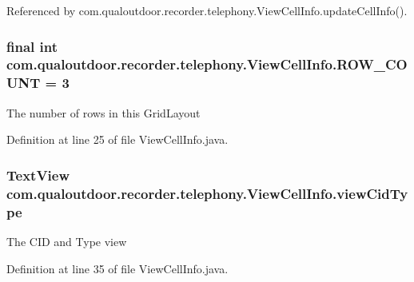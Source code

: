 Referenced by com.\-qualoutdoor.\-recorder.\-telephony.\-View\-Cell\-Info.\-update\-Cell\-Info().

\hypertarget{classcom_1_1qualoutdoor_1_1recorder_1_1telephony_1_1ViewCellInfo_a6bc2da31e8016dcce55517756d9c00aa}{
\subsubsection[{R\-O\-W\-\_\-\-C\-O\-U\-N\-T}]{\setlength{\rightskip}{0pt plus 5cm}final int com.\-qualoutdoor.\-recorder.\-telephony.\-View\-Cell\-Info.\-R\-O\-W\-\_\-\-C\-O\-U\-N\-T = 3\hspace{0.3cm}{\ttfamily [static]}}}\label{classcom_1_1qualoutdoor_1_1recorder_1_1telephony_1_1ViewCellInfo_a6bc2da31e8016dcce55517756d9c00aa}
The number of rows in this Grid\-Layout 

Definition at line 25 of file View\-Cell\-Info.\-java.

\hypertarget{classcom_1_1qualoutdoor_1_1recorder_1_1telephony_1_1ViewCellInfo_a697d070234e3eec55fe8f912613217f9}{
\subsubsection[{view\-Cid\-Type}]{\setlength{\rightskip}{0pt plus 5cm}Text\-View com.\-qualoutdoor.\-recorder.\-telephony.\-View\-Cell\-Info.\-view\-Cid\-Type\hspace{0.3cm}{\ttfamily [private]}}}\label{classcom_1_1qualoutdoor_1_1recorder_1_1telephony_1_1ViewCellInfo_a697d070234e3eec55fe8f912613217f9}
The C\-I\-D and Type view 

Definition at line 35 of file View\-Cell\-Info.\-java.

